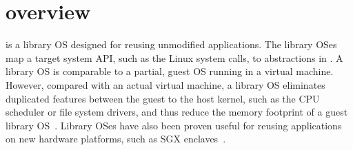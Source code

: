 \section{\graphene{} overview}
\label{sec:overview:libos}

\graphene{} is a library OS designed for reusing unmodified applications.
The library OSes map a target system API, such as the Linux system calls, to abstractions in \thehostabi{}. %
A library OS is comparable to a partial, guest OS running in a virtual machine.
However, compared with an actual virtual machine, a library OS eliminates duplicated features between the guest to the host kernel, such as the CPU scheduler or file system drivers, and thus reduce the memory footprint of a guest library OS~\cite{porter11drawbridge,unikernels}.
Library OSes have also been proven useful for reusing applications on new hardware platforms, such as SGX enclaves~\cite{baumann14haven}.



